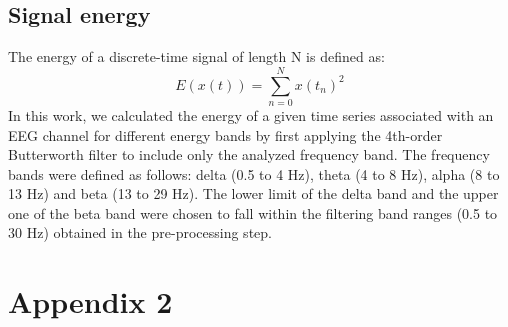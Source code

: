 \documentclass[a4paper,fleqn]{cas-sc}
\begin{document}
\subsection{Signal energy}

The energy of a discrete-time signal of length N is defined as:
\begin{equation}
    E(x(t)) = \sum_{n=0}^{N}x(t_n)^{2} 
\end{equation}
In this work, we calculated the energy of a given time series associated with an EEG channel for different energy bands by first applying the 4th-order Butterworth filter to include only the analyzed frequency band. The frequency bands were defined as follows: delta (0.5 to 4 Hz), theta (4 to 8 Hz), alpha (8 to 13 Hz) and beta (13 to 29 Hz). The lower limit of the delta band and the upper one of the beta band were chosen to fall within the filtering band ranges (0.5 to 30 Hz) obtained in the pre-processing step.

\section{Appendix 2}
\label{chapter:appendix-2}
\end{document}

